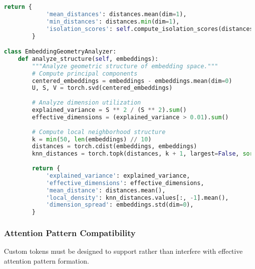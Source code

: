 \begin{lstlisting}[language=Python, caption=Embedding space analysis for custom token design]
        return {
            'mean_distances': distances.mean(dim=1),
            'min_distances': distances.min(dim=1),
            'isolation_scores': self.compute_isolation_scores(distances)
        }

class EmbeddingGeometryAnalyzer:
    def analyze_structure(self, embeddings):
        """Analyze geometric structure of embedding space."""
        # Compute principal components
        centered_embeddings = embeddings - embeddings.mean(dim=0)
        U, S, V = torch.svd(centered_embeddings)
        
        # Analyze dimension utilization
        explained_variance = S ** 2 / (S ** 2).sum()
        effective_dimensions = (explained_variance > 0.01).sum()
        
        # Compute local neighborhood structure
        k = min(50, len(embeddings) // 10)
        distances = torch.cdist(embeddings, embeddings)
        knn_distances = torch.topk(distances, k + 1, largest=False, sorted=True)
        
        return {
            'explained_variance': explained_variance,
            'effective_dimensions': effective_dimensions,
            'mean_distance': distances.mean(),
            'local_density': knn_distances.values[:, -1].mean(),
            'dimension_spread': embeddings.std(dim=0),
        }
\end{lstlisting}

\subsubsection{Attention Pattern Compatibility}

Custom tokens must be designed to support rather than interfere with effective attention pattern formation.

